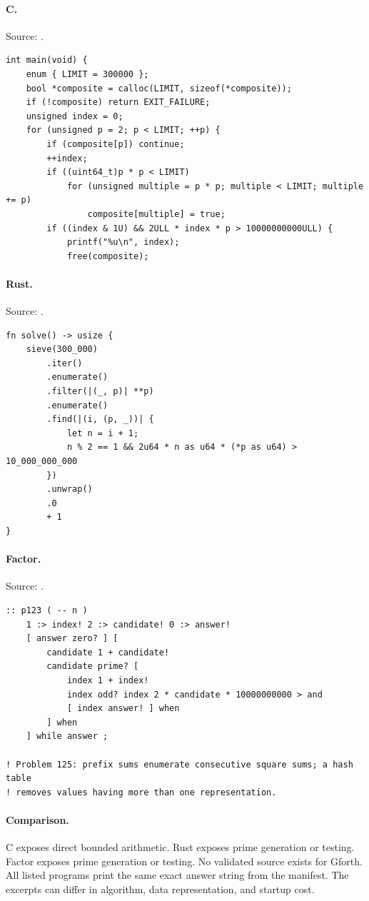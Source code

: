 \paragraph{C.} Source: .
\begin{lstlisting}
int main(void) {
    enum { LIMIT = 300000 };
    bool *composite = calloc(LIMIT, sizeof(*composite));
    if (!composite) return EXIT_FAILURE;
    unsigned index = 0;
    for (unsigned p = 2; p < LIMIT; ++p) {
        if (composite[p]) continue;
        ++index;
        if ((uint64_t)p * p < LIMIT)
            for (unsigned multiple = p * p; multiple < LIMIT; multiple += p)
                composite[multiple] = true;
        if ((index & 1U) && 2ULL * index * p > 10000000000ULL) {
            printf("%u\n", index);
            free(composite);
\end{lstlisting}

\paragraph{Rust.} Source: .
\begin{lstlisting}
fn solve() -> usize {
    sieve(300_000)
        .iter()
        .enumerate()
        .filter(|(_, p)| **p)
        .enumerate()
        .find(|(i, (p, _))| {
            let n = i + 1;
            n % 2 == 1 && 2u64 * n as u64 * (*p as u64) > 10_000_000_000
        })
        .unwrap()
        .0
        + 1
}
\end{lstlisting}

\paragraph{Factor.} Source: .
\begin{lstlisting}
:: p123 ( -- n )
    1 :> index! 2 :> candidate! 0 :> answer!
    [ answer zero? ] [
        candidate 1 + candidate!
        candidate prime? [
            index 1 + index!
            index odd? index 2 * candidate * 10000000000 > and
            [ index answer! ] when
        ] when
    ] while answer ;

! Problem 125: prefix sums enumerate consecutive square sums; a hash table
! removes values having more than one representation.
\end{lstlisting}

\paragraph{Comparison.}
C exposes direct bounded arithmetic. Rust exposes prime generation or testing. Factor exposes prime generation or testing.
No validated source exists for Gforth.
All listed programs print the same exact answer string from the manifest. The excerpts can differ in algorithm, data representation, and startup cost.


